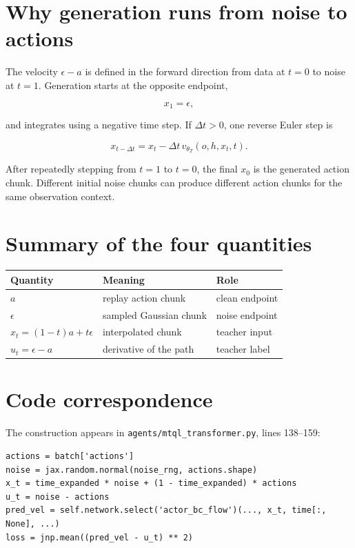 \documentclass[11pt]{article}
\begin{document}
\section{Why generation runs from noise to actions}

The velocity $\epsilon-a$ is defined in the forward direction from data at
$t=0$ to noise at $t=1$.  Generation starts at the opposite endpoint,

\begin{equation}
    x_1=\epsilon,
\end{equation}

and integrates using a negative time step.  If $\Delta t>0$, one reverse Euler
step is

\begin{equation}
    x_{t-\Delta t}
    =x_t-\Delta t\,
      v_{\theta_T}(o,h,x_t,t).
\end{equation}

After repeatedly stepping from $t=1$ to $t=0$, the final $x_0$ is the generated
action chunk.  Different initial noise chunks can produce different action
chunks for the same observation context.

\section{Summary of the four quantities}

\begin{center}
\begin{tabular}{lll}
\toprule
Quantity & Meaning & Role \\
\midrule
$a$ & replay action chunk & clean endpoint \\
$\epsilon$ & sampled Gaussian chunk & noise endpoint \\
$x_t=(1-t)a+t\epsilon$ & interpolated chunk & teacher input \\
$u_t=\epsilon-a$ & derivative of the path & teacher label \\
\bottomrule
\end{tabular}
\end{center}

\section{Code correspondence}

The construction appears in
\texttt{agents/mtql\_transformer.py}, lines 138--159:

\begin{verbatim}
actions = batch['actions']
noise = jax.random.normal(noise_rng, actions.shape)
x_t = time_expanded * noise + (1 - time_expanded) * actions
u_t = noise - actions
pred_vel = self.network.select('actor_bc_flow')(..., x_t, time[:, None], ...)
loss = jnp.mean((pred_vel - u_t) ** 2)
\end{verbatim}

\begin{center}
\end{center}
\end{document}
